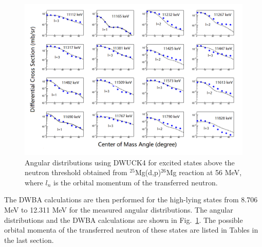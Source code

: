 {\begin{landscape}
    \begin{figure}[tpb]
    \centerline{\includegraphics[scale=0.7]{graph/ch5/dwba}}
    \caption{Angular distributions using DWUCK4 for excited states above the neutron threshold obtained from $^{25}$Mg(d,p)$^{26}$Mg reaction at 56 MeV, where $l_n$ is the orbital momentum of the transferred neutron. }
    \label{fig:26Mg}
    \end{figure}
\end{landscape}


The DWBA calculations are then  performed for the high-lying states from 8.706 MeV to  12.311 MeV for the measured angular distributions. The  angular distributions and the DWBA calculations are shown in Fig.~\ref{fig:26Mg}. The possible orbital momenta of the transferred neutron of these states are listed in Tables in the last section.

}
